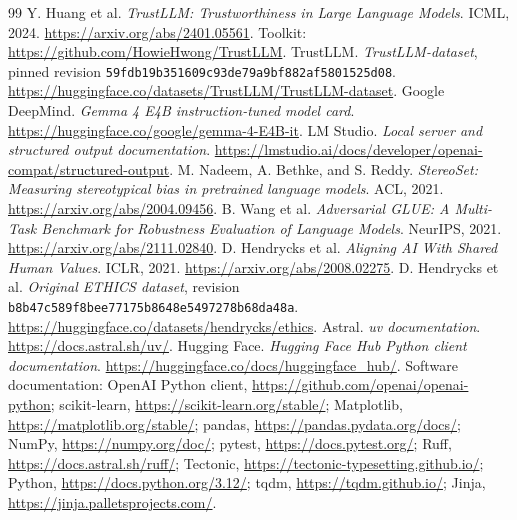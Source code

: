 \begingroup\raggedright
\begin{thebibliography}{99}
 Y. Huang et al. \emph{TrustLLM: Trustworthiness in Large Language Models}.
ICML, 2024. \url{https://arxiv.org/abs/2401.05561}.
Toolkit: \url{https://github.com/HowieHwong/TrustLLM}.
 TrustLLM. \emph{TrustLLM-dataset}, pinned revision
\nolinkurl{59fdb19b351609c93de79a9bf882af5801525d08}.
\url{https://huggingface.co/datasets/TrustLLM/TrustLLM-dataset}.
 Google DeepMind. \emph{Gemma 4 E4B instruction-tuned model card}.
\url{https://huggingface.co/google/gemma-4-E4B-it}.
 LM Studio. \emph{Local server and structured output documentation}.
\url{https://lmstudio.ai/docs/developer/openai-compat/structured-output}.
 M. Nadeem, A. Bethke, and S. Reddy. \emph{StereoSet: Measuring
stereotypical bias in pretrained language models}. ACL, 2021.
\url{https://arxiv.org/abs/2004.09456}.
 B. Wang et al. \emph{Adversarial GLUE: A Multi-Task Benchmark for
Robustness Evaluation of Language Models}. NeurIPS, 2021.
\url{https://arxiv.org/abs/2111.02840}.
 D. Hendrycks et al. \emph{Aligning AI With Shared Human Values}.
ICLR, 2021. \url{https://arxiv.org/abs/2008.02275}.
 D. Hendrycks et al. \emph{Original ETHICS dataset},
revision \nolinkurl{b8b47c589f8bee77175b8648e5497278b68da48a}.
\url{https://huggingface.co/datasets/hendrycks/ethics}.
 Astral. \emph{uv documentation}. \url{https://docs.astral.sh/uv/}.
 Hugging Face. \emph{Hugging Face Hub Python client documentation}.
\url{https://huggingface.co/docs/huggingface_hub/}.
 Software documentation:
OpenAI Python client, \url{https://github.com/openai/openai-python};
scikit-learn, \url{https://scikit-learn.org/stable/};
Matplotlib, \url{https://matplotlib.org/stable/};
pandas, \url{https://pandas.pydata.org/docs/};
NumPy, \url{https://numpy.org/doc/};
pytest, \url{https://docs.pytest.org/};
Ruff, \url{https://docs.astral.sh/ruff/};
Tectonic, \url{https://tectonic-typesetting.github.io/};
Python, \url{https://docs.python.org/3.12/};
tqdm, \url{https://tqdm.github.io/};
Jinja, \url{https://jinja.palletsprojects.com/}.
\end{thebibliography}
\endgroup

